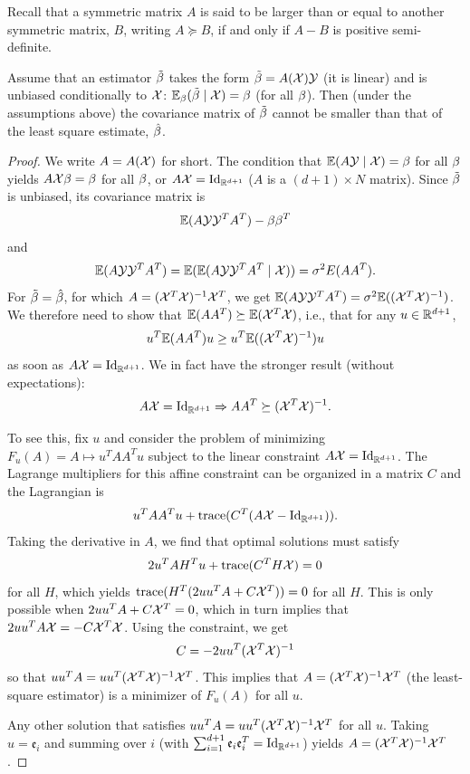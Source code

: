 Recall that a symmetric matrix $A$ is said to be larger  than or equal to another
symmetric matrix, $B$, writing $A\succeq B$, if and only if $A-B$ is positive semi-definite.
\begin{theorem}
Assume that an estimator $\tilde {\beta}$ takes the form $\tilde {\beta} = A({\mathcal X}){\mathcal Y}$ (it is
linear) and is unbiased conditionally to ${\mathcal X}$: $\bm{\mathbb E}_{\beta}(\tilde {\beta}\mid {\mathcal X}) =
\beta$ (for all $\beta$).
Then (under the assumptions above) the covariance matrix of $\tilde {\beta}$ cannot be smaller than that
of the least square estimate, $\hat{\beta}$.
\end{theorem}
\begin{proof}
We write $A = A({\mathcal X})$ for short.
The condition
that $\bm{\mathbb E}(A{\mathcal Y}\mid{\mathcal X}) = \beta$ for all $\beta$ yields $A{\mathcal X} \beta = \beta$ for all $\beta$, 
or $A\CX = \Id_{\mR^{d+1}}$ ($A$ is a $(d+1) \times N$ matrix). Since $\tilde{\beta}$ is unbiased, its covariance matrix is 
\[
\bm{\mathbb E}(A{\mathcal Y}{\mathcal Y}^TA^T) - \beta\beta^T
\]
and 
\[
\bm{\mathbb E}(A{\mathcal Y}{\mathcal Y}^TA^T) = \bm{\mathbb E}(\bm{\mathbb E}(A{\mathcal Y}{\mathcal Y}^TA^T\mid {\mathcal X})) = \sigma^2 E(AA^T).
\]
 For $\tilde{\beta} = \hat{\beta}$, for which $A = ({\mathcal X}^T{\mathcal X})^{-1}{\mathcal X}^T$, we get $\bm{\mathbb E}(A{\mathcal Y}{\mathcal Y}^TA^T) =  \sigma^2 \bm{\mathbb E}(({\mathcal X}^T{\mathcal X})^{-1})$. We therefore need to show that $\bm{\mathbb E}(AA^T) \succeq \bm{\mathbb E}({\mathcal X}^T{\mathcal X})$, i.e., that for any $u\in{\mathbb{R}}^{d+1}$, 
$$ u^T \bm{\mathbb E}(AA^T)  u \geq u^T\bm{\mathbb E}(({\mathcal X}^T{\mathcal X})^{-1}) u$$
as soon as $A\CX = \Id[d+1]$. We in fact have the stronger result (without expectations): 
$$
A\CX = \Id[d+1] \Ria AA^T \succeq (\CX^T\CX)^{-1}.
$$

To see this, fix $u$ and consider the problem of minimizing  $F_u(A) = A \mapsto u^T AA^T
u$ subject to the linear constraint $A\CX = \Id[d+1]$. The Lagrange multipliers for
this affine constraint can be organized in a matrix $C$ and the
Lagrangian is
$$ u^T AA^T u + \trace(C^T (A\CX- \Id[d+1])).$$
Taking the derivative in $A$, we find that optimal solutions must satisfy
$$ 2 u^T AH^T u + {\mathrm{trace}}(C^T H{\mathcal X}) = 0$$
for all $H$, which yields ${\mathrm{trace}}(H^T (2 uu^TA + C {\mathcal X}^T)) = 0$ for all $H$. This is only possible when $2 uu^TA + C {\mathcal X}^T = 0$, which
in turn implies that 
$2 uu^TA{\mathcal X} =   -C {\mathcal X}^T{\mathcal X}$. Using the  constraint, we get
$$
C  = -2 uu^T ({\mathcal X}^T{\mathcal X})^{-1}
$$
so that
$uu^TA = uu^T ({\mathcal X}^T{\mathcal X})^{-1} {\mathcal X}^T$. 
This implies that $A = ({\mathcal X}^T{\mathcal X})^{-1} {\mathcal X}^T$ (the least-square estimator) is a minimizer of $F_u(A)$ for all
$u$. 

Any other solution that satisfies $uu^TA = uu^T ({\mathcal X}^T{\mathcal X})^{-1} {\mathcal X}^T$ for all $u$. Taking $u = \mathfrak e_i$ and summing over $i$ (with $\sum_{i=1}^{d+1} \mathfrak e_i \mathfrak e_i^T = \Id[d+1]$) yields $A = ({\mathcal X}^T{\mathcal X})^{-1} {\mathcal X}^T$.
\end{proof}


